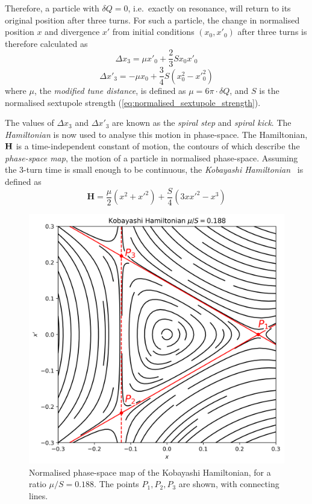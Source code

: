 \documentclass[11pt]{report}
\begin{document}
Therefore, a particle with $\delta Q=0$, i.e.\ exactly on resonance, will return to its original position after three turns. For such a particle, the change in normalised position $x$ and divergence $x'$ from initial conditions $(x_0, x'_0)$ after three turns is therefore calculated as
\begin{equation}
  \Delta x_3 = \mu x'_0 + \frac 23 S x_0x'_0
  \label{eq:spiral_step}
\end{equation}
\begin{equation}
  \Delta x'_3 = -\mu x_0 + \frac 34 S (x_0^2-x'^2_0)
  \label{eq:spiral_kick}
\end{equation}
where $\mu$, the \textit{modified tune distance}, is defined as $\mu = 6\pi\cdot\delta Q$, and $S$ is the normalised sextupole strength (\autoref{eq:normalised_sextupole_strength}).

The values of $\Delta x_3$ and $\Delta x'_3$ are known as the \textit{spiral step} and \textit{spiral kick}.
The \textit{Hamiltonian} is now used to analyse this motion in phase-space. The Hamiltonian, $\bf H$ is a time-independent constant of motion, the contours of which describe the \textit{phase-space map}, the motion of a particle in normalised phase-space. Assuming the 3-turn time is small enough to be continuous, the \textit{Kobayashi Hamiltonian}~\cite{kobayashi} is defined as
\begin{equation}
  \textbf{H} =\frac\mu 2(x^2+x'^2)+\frac S4(3xx'^2-x^3)
\end{equation}

\begin{figure}
  \centering
  \includegraphics[width=0.6\linewidth]{kobayashi.png}
  \caption{Normalised phase-space map of the Kobayashi Hamiltonian, for a ratio $\mu/S=0.188$. The points $P_1, P_2, P_3$ are shown, with connecting lines.}\label{fig:kobayashi}
\end{figure}
\end{document}
